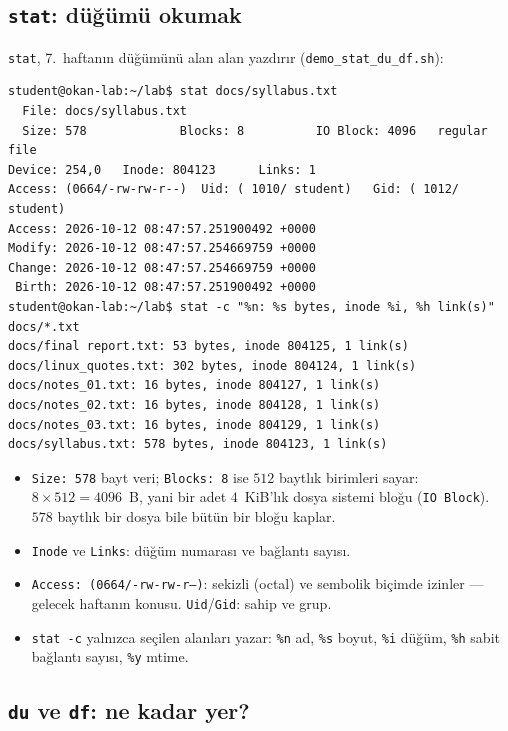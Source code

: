 \documentclass[11pt,a4paper]{article}
\newcommand{\cmd}[1]{\texttt{#1}}
\begin{document}
\subsection{\texttt{stat}: düğümü okumak}
\label{sec:stat}

\cmd{stat}, 7.~haftanın düğümünü alan alan yazdırır (\cmd{demo\_stat\_du\_df.sh}):

\begin{lstlisting}[style=term]
student@okan-lab:~/lab$ stat docs/syllabus.txt
  File: docs/syllabus.txt
  Size: 578             Blocks: 8          IO Block: 4096   regular file
Device: 254,0   Inode: 804123      Links: 1
Access: (0664/-rw-rw-r--)  Uid: ( 1010/ student)   Gid: ( 1012/ student)
Access: 2026-10-12 08:47:57.251900492 +0000
Modify: 2026-10-12 08:47:57.254669759 +0000
Change: 2026-10-12 08:47:57.254669759 +0000
 Birth: 2026-10-12 08:47:57.251900492 +0000
student@okan-lab:~/lab$ stat -c "%n: %s bytes, inode %i, %h link(s)" docs/*.txt
docs/final report.txt: 53 bytes, inode 804125, 1 link(s)
docs/linux_quotes.txt: 302 bytes, inode 804124, 1 link(s)
docs/notes_01.txt: 16 bytes, inode 804127, 1 link(s)
docs/notes_02.txt: 16 bytes, inode 804128, 1 link(s)
docs/notes_03.txt: 16 bytes, inode 804129, 1 link(s)
docs/syllabus.txt: 578 bytes, inode 804123, 1 link(s)
\end{lstlisting}

\begin{itemize}
  \item \texttt{Size: 578} bayt veri; \texttt{Blocks: 8} ise $512$ baytlık birimleri sayar: $8 \times 512 = 4096$~B, yani bir adet $4$~KiB'lık dosya sistemi bloğu (\texttt{IO Block}). $578$ baytlık bir dosya bile bütün bir bloğu kaplar.
  \item \texttt{Inode} ve \texttt{Links}: düğüm numarası ve bağlantı sayısı.
  \item \texttt{Access: (0664/-rw-rw-r--)}: sekizli (octal) ve sembolik biçimde izinler --- gelecek haftanın konusu. \texttt{Uid}/\texttt{Gid}: sahip ve grup.
  \item \cmd{stat -c} yalnızca seçilen alanları yazar: \texttt{\%n} ad, \texttt{\%s} boyut, \texttt{\%i} düğüm, \texttt{\%h} sabit bağlantı sayısı, \texttt{\%y} mtime.
\end{itemize}

\subsection{\texttt{du} ve \texttt{df}: ne kadar yer?}
\end{document}
